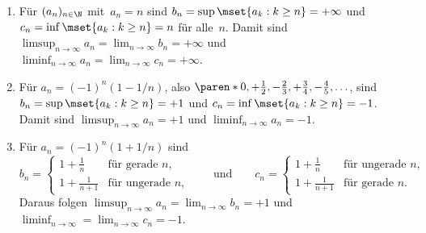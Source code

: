 \documentclass[a4paper]{article}
\begin{document}
\begin{example}\leavevmode
    \begin{enumerate}
        \item Für $(a_n)_{n\in\N}$ mit~$a_n = n$ sind $b_n = \sup\mset{a_k : k \geq n} = +\infty$ und $c_n = \inf\mset{a_k : k \geq n} = n$ für alle~$n$. Damit sind $\limsup_{n\to\infty} a_n = \lim_{n\to\infty} b_n = +\infty$ und $\liminf_{n\to\infty} a_n = \lim_{n\to\infty} c_n = +\infty$.
        \item Für $a_n = (-1)^n (1-1/n)$, also $\paren*{0, +\frac{1}{2}, -\frac{2}{3}, +\frac{3}{4}, -\frac{4}{5}, \dots}$, sind $b_n = \sup\mset{a_k : k \geq n} = +1$ und $c_n = \inf\mset{a_k : k \geq n} = -1$. Damit sind $\limsup_{n\to\infty} a_n = +1$ und $\liminf_{n\to\infty} a_n = -1$.
        \item Für $a_n = (-1)^n (1+1/n)$ sind
              \begin{equation*}
                  b_n = \begin{cases}
                      1 + \frac{1}{n}   & \text{für gerade } n,   \\
                      1 + \frac{1}{n+1} & \text{für ungerade } n,
                  \end{cases}\qquad\text{und}\qquad
                  c_n = \begin{cases}
                      1 + \frac{1}{n}   & \text{für ungerade } n, \\
                      1 + \frac{1}{n+1} & \text{für gerade } n.
                  \end{cases}
              \end{equation*}
              Daraus folgen $\limsup_{n\to\infty} a_n = \lim_{n\to\infty} b_n = +1$ und $\liminf_{n\to\infty} = \lim_{n\to\infty} c_n = -1$.


\end{enumerate}
\end{example}
\end{document}
